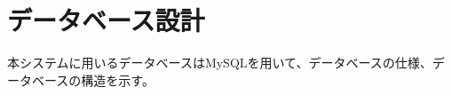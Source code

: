 \documentclass[a4j]{jarticle}
\begin{document}

\section{データベース設計}
本システムに用いるデータベースはMySQLを用いて、データベースの仕様、データベースの構造を示す。
\end{document}
